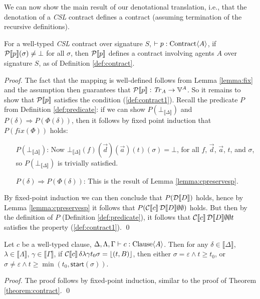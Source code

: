 \documentclass[orivec,final]{llncs-href}
\newcommand{\traceset}[1]{\mathit{Tr}_{#1}}
\newcommand{\verdictset}[1]{\mathbb{V}^{#1}}
\newcommand{\contractset}[1]{\traceset{#1} \to \verdictset{#1}}
\newcommand{\dendom}[1]{\llbracket #1 \rrbracket}
\newcommand{\tracestart}{\mathsf{start}}
\newcommand{\lift}[1]{\lfloor #1 \rfloor}
\newcommand{\trace}{\sigma}
\newcommand{\emptytrace}{\varepsilon}
\newcommand{\csl}{\textit{CSL}}
\begin{document}
We can now show the main result of our denotational translation, i.e.,
that the denotation of a \csl{} contract defines a contract (assuming
termination of the recursive definitions).
\begin{theorem}\label{theorem:contract}
  For a well-typed \csl{} contract over signature $S$,
  $\vdash p : \mathrm{Contract} \langle A \rangle$, if $\cdencontract{p}(\trace) \neq \bot$ for all $\trace$, then
  $\mathcal{P}\llbracket p \rrbracket$ defines a contract involving agents $A$ over
  signature $S$, as of Definition \ref{def:contract}.
\end{theorem}
\begin{proof}
  The fact that the mapping is well-defined follows from Lemma
  \ref{lemma:fix} and the assumption then guarantees that
  $\cdencontract{p} : \contractset{A}$. So it remains to
  show that $\mathcal{P}\llbracket p \rrbracket$ satisfies the condition
  (\ref{def:contract1}). Recall the predicate $P$ from Definition
  \ref{def:predicate}: if we can show $P(\bot_{\dendom{\Delta}})$ and
  $P(\delta) \Rightarrow P(\Phi(\delta))$, then it follows by fixed
  point induction that $P(\mathit{fix}(\Phi))$ holds:
  \begin{itemize}\itemsep=5pt
  \item[$P(\bot_{\dendom{\Delta}})$:] Now
    $\bot_{\dendom{\Delta}}(f)(\vec{d})(\vec{a})(t)(\trace) = \bot$,
    for all $f$, $\vec{d}$, $\vec{a}$, $t$, and $\trace$, so
    $P(\bot_{\dendom{\Delta}})$ is trivially satisfied.
  \item[$P(\delta) \Rightarrow P(\Phi(\delta))$:] This is the result of
    Lemma \ref{lemma:cpreservesp}.
  \end{itemize}
  
  By fixed-point induction we can then conclude that
  $P(\mathcal{D}\llbracket D \rrbracket)$ holds, hence by Lemma
  \ref{lemma:cpreservesp} it follows that
  $P(\mathcal{C}\!\left\llbracket c \right\rrbracket \mathcal{D}\llbracket D \rrbracket \emptyset \emptyset  )$
  holds. But then by the definition of $P$ (Definition
  \ref{def:predicate}), it follows that
  $\cdenclause{c}{\cdencontext{D}}{\emptyset}{\emptyset}{t}$ satisfies
  the property (\ref{def:contract1}).
  \qed
\end{proof}

\begin{corollary}\label{corollary:p}
  Let $c$ be a well-typed clause,
  $\Delta,\Lambda,\Gamma \vdash c : \mathrm{Clause} \langle A \rangle$. 
  Then for any $\delta \in \dendom{\Delta}$, $\lambda \in
  \dendom{\Lambda}$, $\gamma \in \dendom{\Gamma}$, if
  $\cdenclause{c}{\delta}{\lambda}{\gamma}{t_0}{\trace} =
  \lift{(t,B)}$, then either $\trace = \emptytrace \land t \geq t_0$,
  or $\trace \neq \emptytrace \land t \geq
  \min(t_0,\tracestart(\trace))$.
\end{corollary}
\begin{proof}
  The proof follows by fixed-point induction, similar to the proof of
  Theorem \ref{theorem:contract}.
  \qed
\end{proof}
\end{document}
